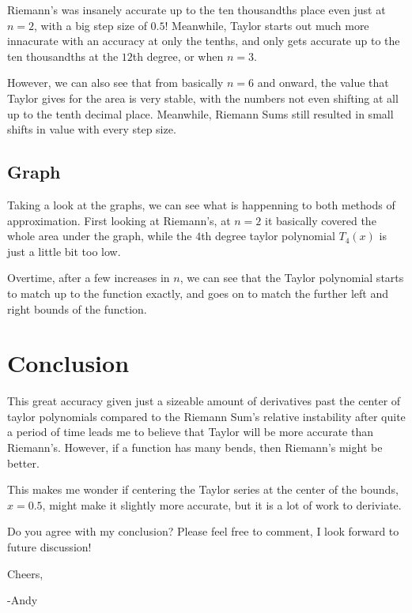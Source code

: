 \documentclass[12pt]{article}
\begin{document}
Riemann's was insanely accurate up to the ten thousandths place even just at $n=2$, with a big step size of $0.5$! Meanwhile, Taylor starts out much more innacurate with an accuracy at only the tenths, and only gets accurate up to the ten thousandths at the $12$th degree, or when $n=3$.

However, we can also see that from basically $n=6$ and onward, the value that Taylor gives for the area is very stable, with the numbers not even shifting at all up to the tenth decimal place. Meanwhile, Riemann Sums still resulted in small shifts in value with every step size. 

\subsection{Graph}
Taking a look at the graphs, we can see what is happenning to both methods of approximation. First looking at Riemann's, at $n=2$ it basically covered the whole area under the graph, while the $4$th degree taylor polynomial $T_{4}(x)$ is just a little bit too low. 

Overtime, after a few increases in $n$, we can see that the Taylor polynomial starts to match up to the function exactly, and goes on to match the further left and right bounds of the function. 

\section{Conclusion}
This great accuracy given just a sizeable amount of derivatives past the center of taylor polynomials compared to the Riemann Sum's relative instability after quite a period of time leads me to believe that Taylor will be more accurate than Riemann's. However, if a function has many bends, then Riemann's might be better.

This makes me wonder if centering the Taylor series at the center of the bounds, $x=0.5$, might make it slightly more accurate, but it is a lot of work to deriviate.

Do you agree with my conclusion? Please feel free to comment, I look forward to future discussion!

\bigskip

Cheers,

-Andy
\end{document}
